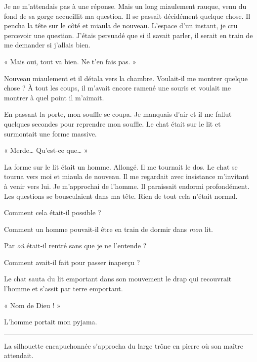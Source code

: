 Je ne m'attendais pas à une réponse. Mais un long miaulement rauque, venu du fond de sa gorge accueillit ma question. Il 
se passait décidément quelque chose. Il pencha la tête sur le côté et miaula de nouveau. L'espace d'un instant, je cru 
percevoir une question. J'étais persuadé que si il savait parler, il serait en train de me demander si j'allais bien.

« Mais oui, tout va bien. Ne t'en fais pas. »

Nouveau miaulement et il détala vers la chambre. Voulait-il me montrer quelque chose ? À tout les coups, il m'avait 
encore ramené une souris et voulait me montrer à quel point il m'aimait.

En passant la porte, mon souffle se coupa. Je manquais d'air et il me fallut quelques secondes pour reprendre mon 
souffle. Le chat était sur le lit et surmontait une forme massive.

« Merde… Qu'est-ce que… »

La forme sur le lit était un homme. Allongé. Il me tournait le dos. Le chat se tourna vers moi et miaula de nouveau. Il 
me regardait avec insistance m'invitant à venir vers lui. Je m'approchai de l'homme. Il paraissait endormi profondément. 
Les questions se bousculaient dans ma tête. Rien de tout cela n'était normal.

Comment cela était-il possible ?

Comment un homme pouvait-il être en train de dormir dans \emph{mon} lit.

Par \emph{où} était-il rentré sans que je ne l'entende ?

Comment avait-il fait pour passer inaperçu ? 

Le chat sauta du lit emportant dans son mouvement le drap qui recouvrait 
l'homme et s'assit par terre emportant.

« Nom de Dieu ! »

L'homme portait mon pyjama.


\fancybreak{$* * *$}

La silhouette encapuchonnée s'approcha du large trône en pierre où son maître attendait.

